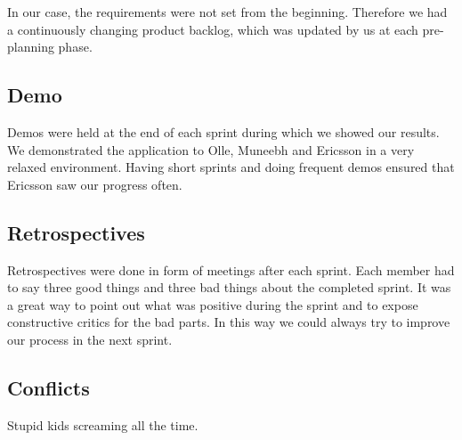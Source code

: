 In our case, the requirements were not set from the beginning. Therefore we had a continuously
changing product backlog, which was updated by us at each pre-planning phase.

\subsection{Demo}
Demos were held at the end of each sprint during which we showed our results.
We demonstrated the application to Olle, Muneebh and Ericsson in a very relaxed environment. Having short sprints and doing frequent
demos ensured that Ericsson saw our progress often.

\subsection{Retrospectives}
Retrospectives were done in form of meetings after each sprint. Each member had to say three good things and three bad things about
the completed sprint. It was a great way to point out what was positive during the sprint
and to expose constructive critics for the bad parts. In this way we could always try to improve our process in the next sprint.

\subsection{Conflicts}
Stupid kids screaming all the time.
